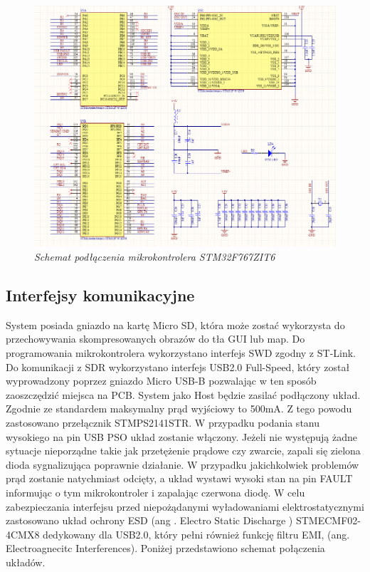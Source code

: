 \documentclass[eng,printmode]{mgr}
\begin{document}
\begin{figure}[!h]
    \centering
    \includegraphics[height=\textwidth, angle=90]{schematics/uC.png}
    \caption{\textit{Schemat podłączenia mikrokontrolera STM32F767ZIT6}}
\end{figure}

\subsection*{Interfejsy komunikacyjne}
System posiada gniazdo na kartę Micro SD, która może zostać wykorzysta do przechowywania skompresowanych obrazów do tła GUI lub map. Do programowania mikrokontrolera wykorzystano interfejs SWD zgodny z ST-Link. Do komunikacji z SDR wykorzystano interfejs USB2.0 Full-Speed, który został wyprowadzony poprzez gniazdo Micro USB-B pozwalając w ten sposób zaoszczędzić miejsca na PCB. System jako Host będzie zasilać podłączony układ. Zgodnie ze standardem maksymalny prąd wyjściowy to 500mA. Z tego powodu zastosowano przełącznik STMPS2141STR. W przypadku podania stanu wysokiego na pin USB PSO układ zostanie włączony. Jeżeli nie występują żadne sytuacje nieporządne takie jak przetężenie prądowe czy zwarcie, zapali się zielona dioda sygnalizująca poprawnie działanie. W przypadku jakichkolwiek problemów prąd zostanie natychmiast odcięty, a układ wystawi wysoki stan na pin FAULT informując o tym mikrokontroler i zapalając czerwona diodę. W celu zabezpieczania interfejsu przed niepożądanymi wyładowaniami elektrostatycznymi zastosowano układ ochrony ESD (ang . Electro Static Discharge ) STMECMF02-4CMX8 dedykowany dla USB2.0, który pełni również funkcję filtru EMI, (ang. Electroagnecitc Interferences). Poniżej przedstawiono schemat połączenia układów.
\end{document}
